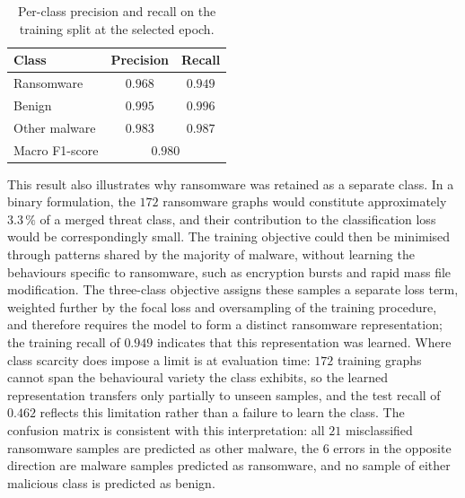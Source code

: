 \documentclass[%
    BCOR=10mm,
    DIV=13,
    toc=bibliography,
    toc=listof,
    oneside,
    12pt,
]{scrbook}
\begin{document}
\begin{table}[htbp]
\centering
\small
\caption{Per-class precision and recall on the training split at the selected
epoch.}
\label{tab:selected_epoch_metrics}
\begin{tabular}{l cc}
\toprule
\textbf{Class} & \textbf{Precision} & \textbf{Recall} \\
\midrule
Ransomware    & $0.968$ & $0.949$ \\
Benign        & $0.995$ & $0.996$ \\
Other malware & $0.983$ & $0.987$ \\
\midrule
Macro F1-score & \multicolumn{2}{c}{$0.980$} \\
\bottomrule
\end{tabular}
\end{table}

This result also illustrates why ransomware was retained as a separate class.
In a binary formulation, the $172$ ransomware graphs would constitute
approximately $3.3\,\%$ of a merged threat class, and their contribution to the
classification loss would be correspondingly small. The training objective
could then be minimised through patterns shared by the majority of malware,
without learning the behaviours specific to ransomware, such as encryption
bursts and rapid mass file modification. The three-class objective assigns
these samples a separate loss term, weighted further by the focal loss and
oversampling of the training procedure, and therefore requires the model to
form a distinct ransomware representation; the training recall of $0.949$
indicates that this representation was learned. Where class scarcity does
impose a limit is at evaluation time: $172$ training graphs cannot span the
behavioural variety the class exhibits, so the learned representation
transfers only partially to unseen samples, and the test recall of $0.462$
reflects this limitation rather than a failure to learn the class.
The confusion matrix is consistent with this interpretation: all $21$
misclassified ransomware samples are predicted as other malware, the $6$ errors
in the opposite direction are malware samples predicted as ransomware, and no
sample of either malicious class is predicted as benign.
\end{document}
